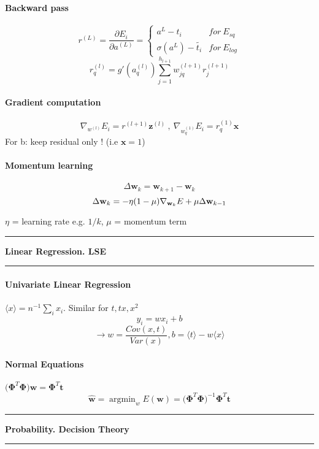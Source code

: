 \documentclass[7pt]{scrartcl}
\newlength{\secskip}
\renewcommand{\section}[1]{
  \vspace{\secskip}
  \hrule\vspace{.3em}
  \textbf{#1}
  \vspace{.3em}
  \hrule
  \vspace{\secskip}
}
\DeclareMathOperator*{\argmin}{argmin}
\renewcommand{\vec}{\mathbf}
\begin{document}
\begin{multicols}{4}
\paragraph{Backward pass}
\[r^{(L)}=\frac{\partial E_i}{\partial a^{(L)}} = \left\{ \begin{array}{ll}a^L - t_i & for~ E_{sq}  \\ \sigma(a^L) - \tilde{t_i} & for~ E_{log} \end{array} \right. \]
\[r_q^{(l)}=g'(a_q^{(l)})\sum_{j=1}^{h_{l+1}}w_{jq}^{(l+1)}r_j^{(l+1)}\]

\paragraph{Gradient computation}
\[\nabla_{w^{(l)}} E_i = r^{(l+1)} \vec{z}^{(l)} ~,~\nabla_{w_q^{(1)}} E_i = r_q^{(1)} \vec{x}\]
For b: keep residual only ! (i.e $\vec x = 1$)

\paragraph{Momentum learning}
\[\Delta \vec w_k = \vec w_{k+1}-\vec w_k\]
\[\Delta \vec w_k = -\eta(1-\mu)\nabla_{\textbf w_k}E+\mu \Delta \vec w_{k-1}\]

$\eta$ = learning rate e.g. $1/k$, $\mu$ = momentum term

\section{Linear Regression. LSE}
\paragraph{Univariate Linear Regression}
$\langle x \rangle = n^{-1} \sum_i x_i $. Similar for $t, tx, x^2$
\[y_i = wx_i + b \]
\[\rightarrow w=\frac{Cov(x,t)}{Var(x)}, b=\langle t \rangle - w \langle x \rangle \]

\paragraph{Normal Equations}
$ \vec{(\Phi}^{T}\vec{\Phi) w = \Phi}^{T} \vec{t}$
\[ \hat{\vec{w}} = \argmin_w E(\vec{w}) = \vec{(\Phi}^{T}\vec{\Phi)}^{-1} \vec{\Phi}^{T}  \vec{t} \]

\section{Probability. Decision Theory}

\end{multicols}
\end{document}
